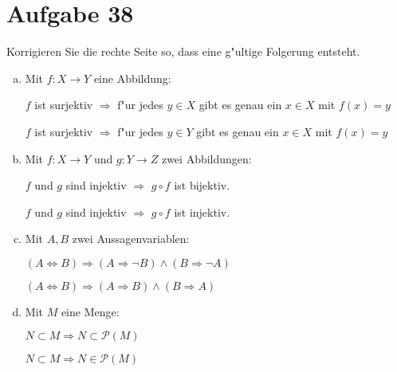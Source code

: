 \section{Aufgabe 38}

Korrigieren Sie die rechte Seite so, dass eine g"ultige Folgerung entsteht.

\begin{enumerate}[(a)]
    \item Mit $f : X \rightarrow Y$ eine Abbildung:

        \quad $f$ ist surjektiv $\Rightarrow$ f"ur jedes $y \in X$ gibt es genau ein $x \in X$ mit $f(x) = y$

        \quad $f$ ist surjektiv $\Rightarrow$ f"ur jedes $y \in Y$ gibt es genau ein $x \in X$ mit $f(x) = y$
    \item Mit $f : X \rightarrow Y$ und $g: Y \rightarrow Z$ zwei Abbildungen:

        \quad $f$ und $g$ sind injektiv $\Rightarrow$ $g \circ f$ ist bijektiv.

        \quad $f$ und $g$ sind injektiv $\Rightarrow$ $g \circ f$ ist injektiv.
    \item Mit $A, B$ zwei Aussagenvariablen:

        \quad $(A \Leftrightarrow B) \Rightarrow (A \Rightarrow \lnot B) \land (B \Rightarrow \lnot A)$

        \quad $(A \Leftrightarrow B) \Rightarrow (A \Rightarrow B) \land (B \Rightarrow A)$
    \item Mit $M$ eine Menge:

        \quad $N \subset M \Rightarrow N \subset \mathcal{P}(M)$

        \quad $N \subset M \Rightarrow N \in \mathcal{P}(M)$
\end{enumerate}

